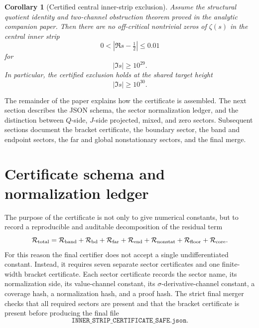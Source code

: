 \documentclass[11pt]{article}
\newtheorem{corollary}[theorem]{Corollary}
\newcommand{\sig}{\sigma}
\newcommand{\Rtot}{\mathcal R_{\rm total}}
\newcommand{\Rband}{\mathcal R_{\rm band}}
\newcommand{\Rbd}{\mathcal R_{\rm bd}}
\newcommand{\Rfar}{\mathcal R_{\rm far}}
\newcommand{\Rend}{\mathcal R_{\rm end}}
\newcommand{\Rnonstat}{\mathcal R_{\rm nonstat}}
\newcommand{\Rfloor}{\mathcal R_{\rm floor}}
\newcommand{\Rcore}{\mathcal R_{\rm core}}
\newcommand{\CertFile}{\texttt{INNER\_STRIP\_CERTIFICATE\_SAFE.json}}
\begin{document}
\begin{corollary}[Certified central inner-strip exclusion]
Assume the structural quotient identity and two-channel obstruction theorem
proved in the analytic companion paper.  Then there are no off-critical
nontrivial zeros of \(\zeta(s)\) in the central inner strip
\[
        0<|\Re s-\tfrac12|\le0.01
\]
for
\[
        |\Im s|\ge10^{29}.
\]
In particular, the certified exclusion holds at the shared target height
\[
        |\Im s|\ge10^{30}.
\]
\end{corollary}

The remainder of the paper explains how the certificate is assembled.  The next
section describes the JSON schema, the sector normalization ledger, and the
distinction between \(Q\)-side, \(J\)-side projected, mixed, and zero sectors.
Subsequent sections document the bracket certificate, the boundary sector, the
band and endpoint sectors, the far and global nonstationary sectors, and the
final merge.



\section{Certificate schema and normalization ledger}

The purpose of the certificate is not only to give numerical constants, but to
record a reproducible and auditable decomposition of the residual term
\[
        \Rtot
        =
        \Rband
        +
        \Rbd
        +
        \Rfar
        +
        \Rend
        +
        \Rnonstat
        +
        \Rfloor
        +
        \Rcore .
\]
For this reason the final certifier does not accept a single undifferentiated
constant.  Instead, it requires seven separate sector certificates and one
finite-width bracket certificate.  Each sector certificate records the sector
name, its normalization side, its value-channel constant, its
\(\sig\)-derivative-channel constant, a coverage hash, a normalization hash,
and a proof hash.  The strict final merger checks that all required sectors are
present and that the bracket certificate is present before producing the final
file
\[
        \CertFile .
\]
\end{document}
